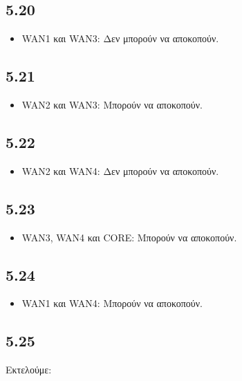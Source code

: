 \documentclass[a4paper, 12pt]{article}
\begin{document}
	\subsection*{5.20}
		\begin{itemize}
			\item WAN1 και WAN3: Δεν μπορούν να αποκοπούν.
		\end{itemize}

	\subsection*{5.21}
		\begin{itemize}
			\item WAN2 και WAN3: Μπορούν να αποκοπούν.
		\end{itemize}

	\subsection*{5.22}
		\begin{itemize}
			\item WAN2 και WAN4: Δεν μπορούν να αποκοπούν.
		\end{itemize}

	\subsection*{5.23}
		\begin{itemize}
			\item WAN3, WAN4 και CORE: Μπορούν να αποκοπούν.
		\end{itemize}

	\subsection*{5.24}
		\begin{itemize}
			\item WAN1 και WAN4: Μπορούν να αποκοπούν.
		\end{itemize}

	\subsection*{5.25}
		Εκτελούμε:
		
\end{document}
